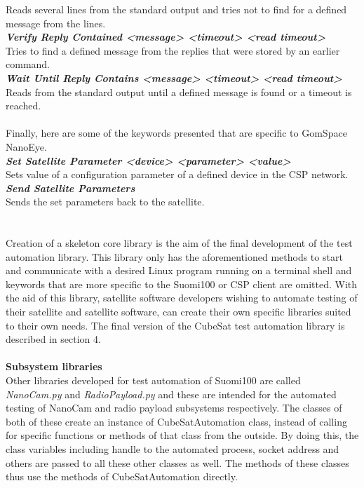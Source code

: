 \documentclass[english,12pt,a4paper,pdftex,elec,utf8]{aaltothesis}
\begin{document}
Reads several lines from the standard output and tries not to find for a defined message from the lines.\\
\textit{\textbf{Verify Reply Contained  <message> <timeout> <read timeout>}}\\
Tries to find a defined message from the replies that were stored by an earlier command.\\
\textit{\textbf{Wait Until Reply Contains  <message> <timeout> <read timeout>}}\\
Reads from the standard output until a defined message is found or a timeout is reached.\\
\\
Finally, here are some of the keywords presented that are specific to GomSpace NanoEye.\\
\textit{\textbf{Set Satellite Parameter  <device> <parameter> <value>}}\\
Sets value of a configuration parameter of a defined device in the CSP network. \\
\textit{\textbf{Send Satellite Parameters}}\\
Sends the set parameters back to the satellite.\\
\\
\\
Creation of a skeleton core library is the aim of the final development of the test automation library. This library only has the aforementioned methods to start and communicate with a desired Linux program running on a terminal shell and keywords that are more specific to the Suomi100 or CSP client are omitted. With the aid of this library, satellite software developers wishing to automate testing of their satellite and satellite software, can       create their own specific libraries suited to their own needs. The final version of the CubeSat test automation library is described in section 4.\\
\\
\textbf{Subsystem libraries}\\ 
Other libraries developed for test automation of Suomi100 are called \textit{NanoCam.py} and \textit{RadioPayload.py} and these are intended for the automated testing of NanoCam and radio payload subsystems respectively. The classes of both of these create an instance of CubeSatAutomation class, instead of calling for specific functions or methods of that class from the outside. By doing this, the class variables including handle to the automated process, socket address and others are passed to all these other classes as well. The methods of these classes thus use the methods of CubeSatAutomation directly.\par
\end{document}
